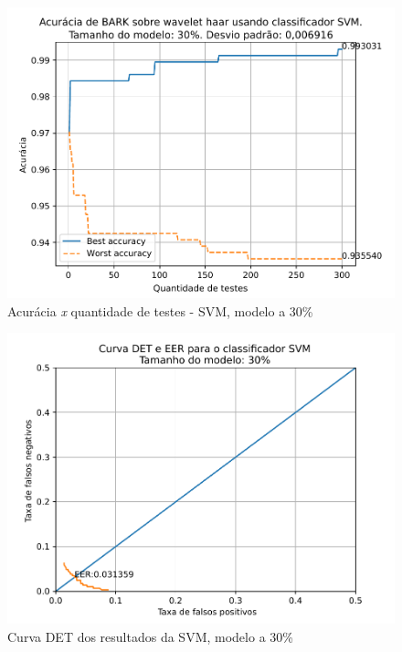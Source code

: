 			\begin{figure}[H]
				\centering
				\includegraphics[width=.9\linewidth]{images/results/confusionMatrices/classifier_SVM_30}
				\caption{Acurácia \textit{x} quantidade de testes - SVM, modelo a 30\%}
				\label{fig:classifiersvm30}
			\end{figure}
		
			\begin{figure}[H]
				\centering
				\includegraphics[width=.9\linewidth]{images/results/det/DET_for_classifier_SVM_30}
				\caption{Curva DET dos resultados da SVM, modelo a 30\%}
				\label{fig:detsvm30}
			\end{figure}
			
